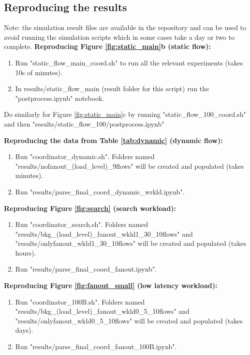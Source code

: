 \documentclass[10pt,conference,compsocconf]{IEEEtran}
\begin{document}
\subsection{Reproducing the results}
\noindent Note: the simulation result files are available in the repository and can be used to avoid running the simulation scripts which in some cases take a day or two to complete.
\noindent \textbf{Reproducing Figure \ref{fig:static_main}b (static flow):}
\begin{enumerate} %
 \item Run "static\_flow\_main\_coord.sh" to run all the relevant experiments (takes 10s of minutes).
 \item In results/static\_flow\_main (result folder for this script) run the "postprocess.ipynb" notebook.
\end{enumerate}
Do similarly for Figure \ref{fig:static_main}c by running "static\_flow\_100\_coord.sh" and then "results/static\_flow\_100/postprocess.ipynb"

\noindent \textbf{Reproducing the data from Table \ref{tab:dynamic} (dynamic flow):}
\begin{enumerate} %
 \item Run "coordinator\_dynamic.sh". Folders named "results/nofanout\_(load\_level)\_9flows" will be created and populated (takes minutes). 
 \item Run "results/parse\_final\_coord\_dynamic\_wrkld.ipynb".
\end{enumerate}

\noindent \textbf{Reproducing Figure \ref{fig:search} (search workload):}
\begin{enumerate}
    \item Run "coordinator\_search.sh". Folders named "results/bkg\_(load\_level)\_fanout\_wkld1\_30\_10flows" and "results/onlyfanout\_wkld1\_30\_10flows" will be created and populated (takes hours).
    \item Run "results/parse\_final\_coord\_fanout.ipynb".
\end{enumerate}

\noindent \textbf{Reproducing Figure \ref{fig:fanout_small} (low latency workload):}
\begin{enumerate}
    \item Run "coordinator\_100B.sh". Folders named "results/bkg\_(load\_level)\_fanout\_wkld0\_5\_10flows" and "results/onlyfanout\_wkld0\_5\_10flows" will be created and populated (takes days).
    \item Run "results/parse\_final\_coord\_fanout\_100B.ipynb".
\end{enumerate}
 
\end{document}
